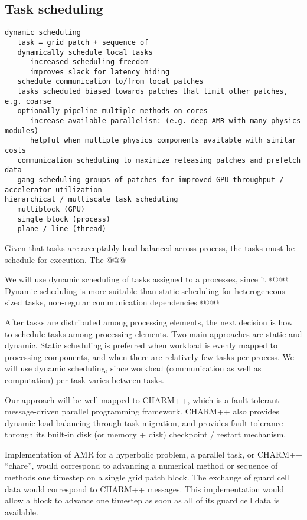\documentclass[14pt,letter]{article}
\begin{document}
\subsection{Task scheduling} \label{ss:scheduling}


\begin{verbatim}
dynamic scheduling
   task = grid patch + sequence of 
   dynamically schedule local tasks
      increased scheduling freedom
      improves slack for latency hiding
   schedule communication to/from local patches
   tasks scheduled biased towards patches that limit other patches, e.g. coarse
   optionally pipeline multiple methods on cores
      increase available parallelism: (e.g. deep AMR with many physics modules)
      helpful when multiple physics components available with similar costs
   communication scheduling to maximize releasing patches and prefetch data
   gang-scheduling groups of patches for improved GPU throughput / accelerator utilization
hierarchical / multiscale task scheduling
   multiblock (GPU)
   single block (process)
   plane / line (thread)
\end{verbatim}

Given that tasks are acceptably load-balanced across process, the
tasks must be schedule for execution.  The @@@


We will use dynamic scheduling of tasks assigned to a processes, since
it @@@  Dynamic scheduling is more suitable than static scheduling for
heterogeneous sized tasks, non-regular communication dependencies @@@


After tasks are distributed among processing elements, the next
decision is how to schedule tasks among processing elements.  Two main
approaches are static and dynamic.  Static scheduling is preferred
when workload is evenly mapped to processing components, and when
there are relatively few tasks per process.  We will use dynamic
scheduling, since workload (communication as well as computation) per
task varies between tasks.

Our approach will be well-mapped to CHARM++,
which is a fault-tolerant message-driven parallel programming
framework.  CHARM++ also provides dynamic load balancing through task
migration, and provides fault tolerance through its built-in disk (or
memory + disk) checkpoint / restart mechanism.

Implementation of AMR for a hyperbolic problem, a parallel task, or
CHARM++ ``chare'', would correspond to advancing a numerical method or
sequence of methods one timestep on a single grid patch block.  The
exchange of guard cell data would correspond to CHARM++ messages.
This implementation would allow a block to advance one timestep as
soon as all of its guard cell data is available.
\end{document}
